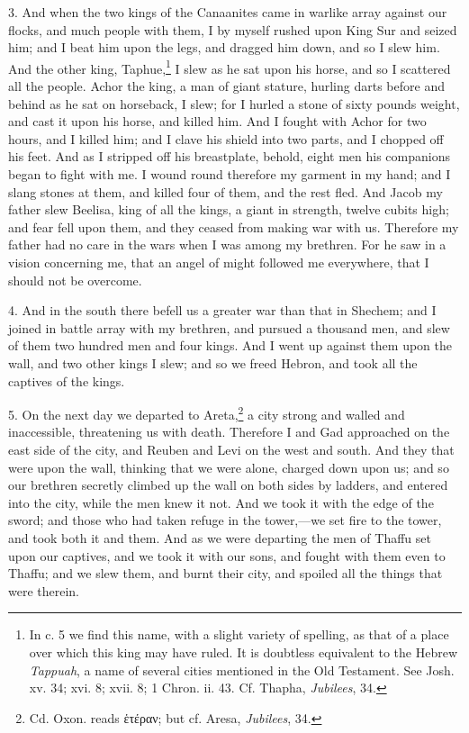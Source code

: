 3. And when the two kings of the Canaanites came in warlike array against our flocks, and much people with them, I by myself rushed upon King Sur and seized him; and I beat him upon the legs, and dragged him down, and so I slew him. And the other king, Taphue,\footnote{In c. 5 we find this name, with a slight variety of spelling, as that of a place over which this king may have ruled. It is doubtless equivalent to the Hebrew \emph{Tappuah}, a name of several cities mentioned in the Old Testament. See Josh. xv. 34; xvi. 8; xvii. 8; 1 Chron. ii. 43. Cf. Thapha, \emph{Jubilees}, 34.} I slew as he sat upon his horse, and so I scattered all the people. Achor the king, a man of giant stature, hurling darts before and behind as he sat on horseback, I slew; for I hurled a stone of sixty pounds weight, and cast it upon his horse, and killed him. And I fought with Achor for two hours, and I killed him; and I clave his shield into two parts, and I chopped off his feet. And as I stripped off his breastplate, behold, eight men his companions began to fight with me. I wound round therefore my garment in my hand; and I slang stones at them, and killed four of them, and the rest fled. And Jacob my father slew Beelisa, king of all the kings, a giant in strength, twelve cubits high; and fear fell upon them, and they ceased from making war with us. Therefore my father had no care in the wars when I was among my brethren. For he saw in a vision concerning me, that an angel of might followed me everywhere, that I should not be overcome.

4. And in the south there befell us a greater war than that in Shechem; and I joined in battle array with my brethren, and pursued a thousand men, and slew of them two hundred men and four kings. And I went up against them upon the wall, and two other kings I slew; and so we freed Hebron, and took all the captives of the kings.

5. On the next day we departed to Areta,\footnote{Cd. Oxon. reads \textgreek{ἑτέραν}; but cf. Aresa, \emph{Jubilees}, 34.} a city strong and walled and inaccessible, threatening us with death. Therefore I and Gad approached on the east side of the city, and Reuben and Levi on the west and south. And they that were upon the wall, thinking that we were alone, charged down upon us; and so our brethren secretly climbed up the wall on both sides by ladders, and entered into the city, while the men knew it not. And we took it with the edge of the sword; and those who had taken refuge in the tower,—we set fire to the tower, and took both it and them. And as we were departing the men of Thaffu set upon our captives, and we took it with our sons, and fought with them even to Thaffu; and we slew them, and burnt their city, and spoiled all the things that were therein.

